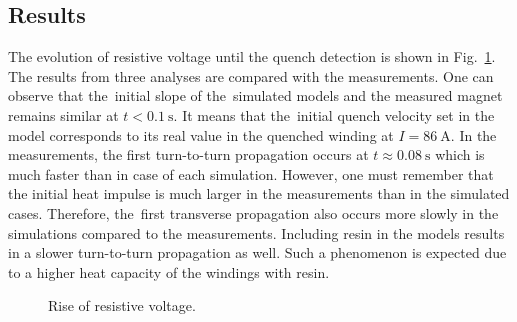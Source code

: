\subsection{Results}

The evolution of resistive voltage until the quench detection is shown in Fig.~\ref{fig: quench_detection_v_res}. The results from three analyses are compared with the measurements. One can observe that the~initial slope of the~simulated models and the measured magnet remains similar at $t < 0.1~\text{s}$. It means that the~initial quench velocity set in the model corresponds to its real value in the quenched winding at $I=86~\text{A}$. In the measurements, the first turn-to-turn propagation occurs at $t \approx 0.08~\text{s}$ which is much faster than in case of each simulation. However, one must remember that the initial heat impulse is much larger in the measurements than in the simulated cases. Therefore, the~first transverse propagation also occurs more slowly in the simulations compared to the measurements. Including resin in the models results in a slower turn-to-turn propagation as well. Such a phenomenon is expected due to a higher heat capacity of the windings with resin. 

\begin{figure}[H]
    \centering
    \caption{Rise of resistive voltage.}
    \label{fig: quench_detection_v_res}
\end{figure}


